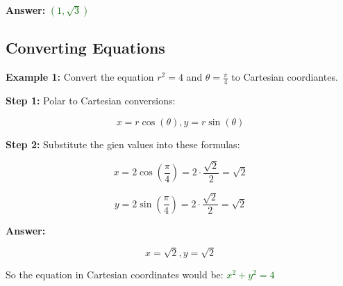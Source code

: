 \documentclass[10pt]{article}                               %
\begin{document}
\begin{adjustwidth}{2em}{0pt}
\begin{adjustwidth}{2em}{0pt}
\begin{examplebox}
\begin{adjustwidth}{2em}{0pt}
                \textbf{Answer:} \textcolor{darkgreen}{\( \left(1,\sqrt{3}\right) \)}

            \end{adjustwidth}

        \end{examplebox}

        \break

        \begin{examplebox}
        
            \subsection*{Converting Equations}

            \textbf{Example 1:} Convert the equation \( r^2 = 4 \) and \( \theta = \frac{\pi}{4} \) to Cartesian coordiantes.
            \vspace{0.5em}

            \begin{adjustwidth}{2em}{0pt}

                \textbf{Step 1:} Polar to Cartesian conversions:

                \vspace{0.25em}

                \[ x = r\cos(\theta), y = r\sin(\theta) \]

                \vspace{0.5em}

                \textbf{Step 2:} Substitute the gien values into these formulas:

                \vspace{0.25em}

                \[ x = 2\cos\left(\frac{\pi}{4}\right) = 2 \cdot \frac{\sqrt{2}}{2} = \sqrt{2} \]

                \[ y = 2\sin\left(\frac{\pi}{4}\right) = 2 \cdot \frac{\sqrt{2}}{2} = \sqrt{2} \]

                \vspace{0.5em}

                \textbf{Answer:}

                \vspace{0.25em}

                \[ x = \sqrt{2}, y = \sqrt{2} \]

                \vspace{0.5em}

                So the equation in Cartesian coordinates would be:
                \textcolor{darkgreen}{\( x^2 + y^2 = 4 \)}


\end{adjustwidth}
\end{examplebox}
\end{adjustwidth}
\end{adjustwidth}
\end{document}
